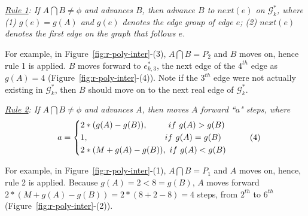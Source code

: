 \vspace{1ex}
\ni \emph{\underline{Rule 1}:
If $A \bigcap B \ne \phi$ and advances $B$, then advance $B$ to $next(e)$ on $\mathcal{G}^*_k$, where (1) $g(e) = g(A)$ and $g(e)$ denotes the edge group of edge $e$; (2) $next(e)$ denotes the first edge on the graph that follows $e$.}
\vspace{1ex}

For example, in Figure~\ref{fig:r-poly-inter}-(3), $A \bigcap B = P_2$ and $B$ moves on, hence rule 1 is applied. $B$ moves forward to $e^*_{k, 3}$, \ie the next edge of the $4^{th}$ edge as $g(A) = 4$ (Figure~\ref{fig:r-poly-inter}-(4)).
Note if the $3^{th}$ edge were not actually existing in $\mathcal{G}^*_k$, then $B$ should move on to the next real edge of $\mathcal{G}^*_k$.


\vspace{1ex}
\ni \emph{\underline{Rule 2}:
If $A \bigcap B \ne \phi$ and advances $A$, then moves $A$ forward ``$a$" steps, where}
\begin{equation*}
\label{equ-rule2}
\small
    \hspace{2ex} a =  \left\{
    \begin{aligned}
        & 2*(g(A) - g(B)),  \hspace{5ex} ~if  ~g(A) > g(B) \\
        & {1},              \hspace{20.5ex}~if  ~g(A) = g(B) \\
        & 2*(M+g(A) - g(B)), ~if  ~g(A) < g(B) \\
    \end{aligned}
    \right.       \hspace{6ex}(4)
\end{equation*}


For example, in Figure~\ref{fig:r-poly-inter}-(1), $A \bigcap B = P_1$ and $A$ moves on, hence, rule 2 is applied. Because $g(A)=2 < 8=g(B)$, $A$ moves forward $2*(M+g(A) - g(B)) = 2*(8+2-8)= 4$ steps, \ie from $2^{th}$ to $6^{th}$ (Figure~\ref{fig:r-poly-inter}-(2)).


